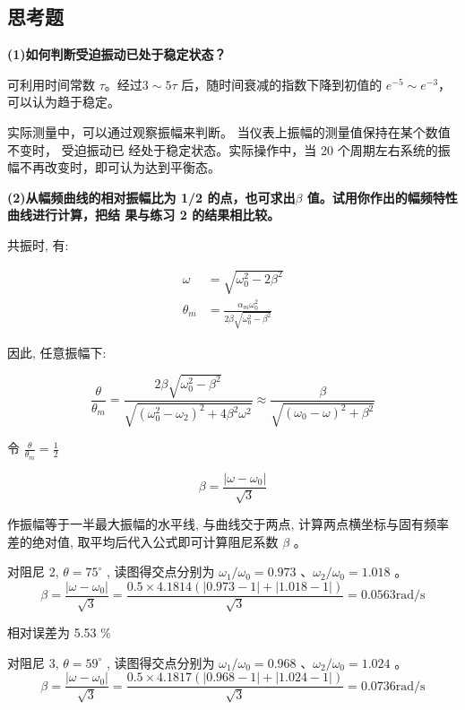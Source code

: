 \documentclass[UTF8]{ctexart}
\begin{document}
\subsection{思考题}

\noindent  \textbf{(1)如何判断受迫振动已处于稳定状态？}

可利用时间常数 $\tau$。经过$ 3 \sim 5\tau$ 后，随时间衰减的指数下降到初值的 $e^{−5} \sim e^{−3}$，可以认为趋于稳定。

实际测量中，可以通过观察振幅来判断。 当仪表上振幅的测量值保持在某个数值不变时， 受迫振动已
经处于稳定状态。实际操作中，当
20 个周期左右系统的振幅不再改变时，即可认为达到平衡态。



\noindent  \textbf{(2)从幅频曲线的相对振幅比为 1/2 的点，也可求出$\beta$ 值。试用你作出的幅频特性曲线进行计算，把结
果与练习 2 的结果相比较。}

共振时, 有:

\begin{align}
\omega &=\sqrt{\omega_{0}^{2}-2 \beta^{2}} \nonumber\\
\theta_{m} &=\frac{\alpha_{m} \omega_{0}^{2}}{2 \beta \sqrt{\omega_{0}^{2}-\beta^{2}}} \nonumber
\end{align}

因此, 任意振幅下:

$$
\frac{\theta}{\theta_{m}}=\frac{2 \beta \sqrt{\omega_{0}^{2}-\beta^{2}}}{\sqrt{\left(\omega_{0}^{2}-\omega_{2}\right)^{2}+4 \beta^{2} \omega^{2}}} \approx \frac{\beta}{\sqrt{\left(\omega_{0}-\omega\right)^{2}+\beta^{2}}}
$$

令 $ \frac{\theta}{\theta_{m}}=\frac{1}{2} $

$$
\beta=\frac{\left|\omega-\omega_{0}\right|}{\sqrt{3}}
$$

作振幅等于一半最大振幅的水平线, 与曲线交于两点, 计算两点横坐标与固有频率差的绝对值, 取平均后代入公式即可计算阻尼系数 $ \beta$  。

对阻尼 2, $\theta=75^{\circ}$ , 读图得交点分别为  $\omega_{1} / \omega_{0}=0.973$ 、$ \omega_{2} / \omega_{0}=1.018 $ 。
$$
\beta=\frac{\left|\omega-\omega_{0}\right|}{\sqrt{3}}=\frac{0.5 \times 4.1814(|0.973-1|+|1.018-1|)}{\sqrt{3}}=0.0563 \mathrm{rad} / \mathrm{s}
$$

相对误差为  5.53 \% 

对阻尼  3, $\theta=59^{\circ}$ , 读图得交点分别为 $ \omega_{1} / \omega_{0}=0.968$ 、$ \omega_{2} / \omega_{0}=1.024 $ 。
$$
\beta=\frac{\left|\omega-\omega_{0}\right|}{\sqrt{3}}=\frac{0.5 \times 4.1817(|0.968-1|+|1.024-1|)}{\sqrt{3}}=0.0736 \mathrm{rad} / \mathrm{s}
$$
\end{document}
